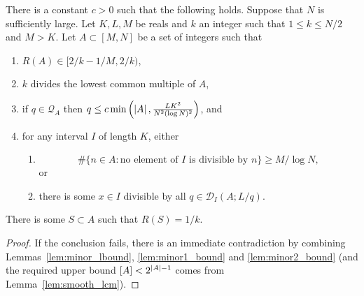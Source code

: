 \begin{proposition}\label{prop:fourier}
  \leanok
There is a constant $c>0$ such that the following holds. Suppose that $N$ is sufficiently large. Let $K,L,M$ be reals and $k$ an integer such that $1\leq k\leq N/2$ and $M>K$. Let $A\subset [M,N]$ be a set of integers such that
\begin{enumerate}
\item $R(A)\in [2/k-1/M,2/k)$,
\item $k$ divides the lowest common multiple of $A$,
\item if $q\in\mathcal{Q}_A$ then $q\leq c\min\left( \left\lvert A\right\rvert,\frac{LK^2}{N^2(\log N)^2}\right)$,  and
\item for any interval $I$ of length $K$, either
\begin{enumerate}
\item \[\# \{ n\in A : \textrm{no element of }I\textrm{ is divisible by }n\}\geq M/\log N,\]
or
\item there is some $x\in I$ divisible by all $q\in\mathcal{D}_I(A; L/q)$.
\end{enumerate}
\end{enumerate}
There is some $S\subset A$ such that $R(S)=1/k$.
\end{proposition}
\begin{proof}
If the conclusion fails, there is an immediate contradiction by combining Lemmas~\ref{lem:minor_lbound}, \ref{lem:minor1_bound} and \ref{lem:minor2_bound} (and the required upper bound $[A]<2^{\left\lvert A\right\rvert-1}$ comes from Lemma~\ref{lem:smooth_lcm}).
\end{proof}
